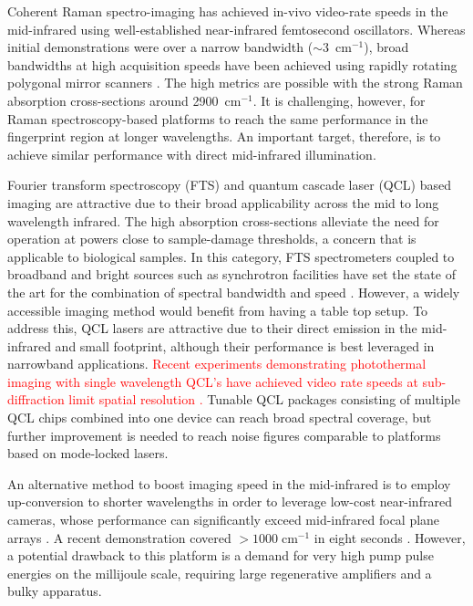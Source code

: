 \documentclass[aip,preprint]{revtex4-1}
\begin{document}

Coherent Raman spectro-imaging has achieved in-vivo video-rate speeds in the mid-infrared \cite{evansChemicalImagingTissue2005, saarVideoRateMolecularImaging2010} using well-established near-infrared femtosecond oscillators. Whereas initial demonstrations were over a narrow bandwidth (\mbox{$\sim$3 $\mathrm{cm^{-1}}$}), broad bandwidths at high acquisition speeds have been achieved using rapidly rotating polygonal mirror scanners \cite{tamamitsuUltrafastBroadbandFouriertransform2017, linMicrosecondFingerprintStimulated2021}. The high metrics are possible with the strong Raman absorption cross-sections around \mbox{2900 $\mathrm{cm^{-1}}$}. It is challenging, however, for Raman spectroscopy-based platforms to reach the same performance in the fingerprint region at longer wavelengths. An important target, therefore, is to achieve similar performance with direct mid-infrared illumination.

Fourier transform spectroscopy (FTS) and quantum cascade laser (QCL) based imaging are attractive due to their broad applicability across the mid to long wavelength infrared. The high absorption cross-sections alleviate the need for operation at powers close to sample-damage thresholds, a concern that is applicable to biological samples. In this category, FTS spectrometers coupled to broadband and bright sources such as synchrotron facilities have set the state of the art for the combination of spectral bandwidth and speed \cite{nasseHighresolutionFouriertransformInfrared2011}. However, a widely accessible imaging method would benefit from having a table top setup. To address this, QCL lasers are attractive due to their direct emission in the mid-infrared and small footprint, although their performance is best leveraged in narrowband applications. 
% 
\textcolor{red}{Recent experiments demonstrating photothermal imaging with single wavelength QCL's have achieved video rate speeds at sub-diffraction limit spatial resolution \cite{ishiganeLabelfreeMidinfraredPhotothermal2023,yinVideorateMidinfraredPhotothermal2023}.}
% 
Tunable QCL packages consisting of multiple QCL chips combined into one device \cite{yehFastInfraredChemical2015,goyalActiveHyperspectralImaging2014,zimmerleiterQCLbasedMidinfraredHyperspectral2021} can reach broad spectral coverage, but further improvement is needed to reach noise figures comparable to platforms based on mode-locked lasers.

An alternative method to boost imaging speed in the mid-infrared is to employ up-conversion to shorter wavelengths in order to leverage low-cost near-infrared cameras, whose performance can significantly exceed mid-infrared focal plane arrays \cite{junaidVideorateMidinfraredHyperspectral2019,knezInfraredChemicalImaging2020,potmaRapidChemicallySelective2021}. A recent demonstration covered \mbox{$>$$1000 \; \mathrm{cm^{-1}}$} in eight seconds \cite{zhaoHighspeedScanlessEntire2023}. However, a potential drawback to this platform is a demand for very high pump pulse energies on the millijoule scale, requiring large regenerative amplifiers and a bulky apparatus.
\end{document}

